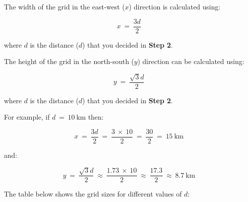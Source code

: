 \documentclass[12pt,a4paper]{book}
\theoremstyle{definition}
\theoremstyle{definition}
\theoremstyle{definition}
\theoremstyle{remark}
\begin{document}
The width of the grid in the east-west (\(x\)) direction is calculated
using:

\[ x ~ = ~ \frac{3d}{2} \]

where \(d\) is the distance (\(d\)) that you decided in \textbf{Step 2}.

The height of the grid in the north-south (\(y\)) direction can be
calculated using:

\[ y ~ = ~ \frac{\sqrt{3}d}{2} \]

where \(d\) is the distance (\(d\)) that you decided in \textbf{Step 2}.

For example, if \(d ~ = ~ 10 ~ \text{km}\) then:

\[ x ~ = ~ \frac{3d}{2} ~ = ~ \frac{3 ~ \times ~ 10}{2} ~ = ~ \frac{30}{2} ~ = ~ 15 ~ \text{km} \]

and:

\[ y ~ = ~ \frac{\sqrt{3}d}{2} ~ \approx ~ \frac{1.73 ~ \times ~ 10}{2} ~ \approx ~ \frac{17.3}{2} ~ \approx ~ 8.7 ~ \text{km} \]

\newpage

The table below shows the grid sizes for different values of \(d\):
\end{document}
